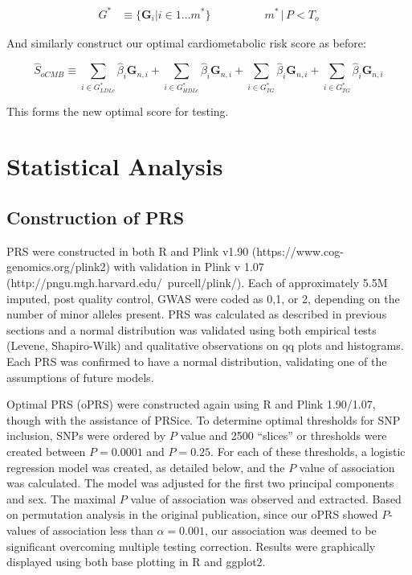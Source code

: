 $$ \begin{aligned} G^* &\equiv \{ \mathbf{G}_i | i \in 1 \dots m^* \} &&&&&& m^* \, |  \, P < T_{o} \end{aligned}$$

And similarly construct our optimal cardiometabolic risk score as before:


$$ \hat{S}_{oCMB} \equiv \sum_{i \in G^*_{LDLc}} \hat{\beta}_i \mathbf{G}_{n, i} + \sum_{i \in G^*_{HDLc}} \hat{\beta}_i \mathbf{G}_{n, i} + \sum_{i \in G^*_{TG}} \hat{\beta}_i \mathbf{G}_{n, i} + \sum_{i \in G^*_{TG}} \hat{\beta}_i \mathbf{G}_{n, i} $$

This forms the new optimal score for testing.

\section{Statistical Analysis}

\subsection{Construction of \ac{PRS}}

\ac{PRS} were constructed in both R and Plink v1.90 (https://www.cog-genomics.org/plink2) with validation in Plink v 1.07 (http://pngu.mgh.harvard.edu/~purcell/plink/). Each of approximately 5.5M imputed, post quality control, \ac{GWAS} were coded as 0,1, or 2, depending on the number of minor alleles present. \ac{PRS} was calculated as described in previous sections and a normal distribution was validated using both empirical tests (Levene, Shapiro-Wilk) and qualitative observations on qq plots and histograms. Each \ac{PRS} was confirmed to have a normal distribution, validating one of the assumptions of future models. 

Optimal \ac{PRS} (\ac{oPRS}) were constructed again using R and Plink 1.90/1.07, though with the assistance of PRSice. \citep{Euesden2014} To determine optimal thresholds for \ac{SNP} inclusion, \acp{SNP} were ordered by $P$ value and 2500 ``slices'' or thresholds were created between $P = 0.0001$ and $P = 0.25$. For each of these thresholds, a logistic regression model was created, as detailed below, and the $P$ value of association was calculated. The model was adjusted for the first two principal components and sex. The maximal $P$ value of association was observed and extracted. Based on permutation analysis in the original publication, since our \ac{oPRS} showed $P$-values of association less than $\alpha = 0.001$, our association was deemed to be significant overcoming multiple testing correction. Results were graphically displayed using both base plotting in R and ggplot2. 

